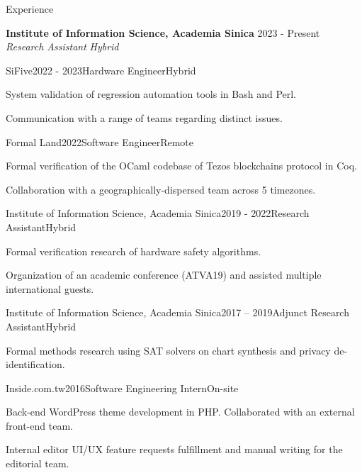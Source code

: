 \documentclass{resume} %
\begin{document}
\begin{rSection}{Experience}

{\bf Institute of Information Science, Academia Sinica} \hfill {2023 - Present} \\
{\em Research Assistant} \hfill {\em Hybrid}
\smallskip

\begin{rSubsection}{SiFive}{2022 - 2023}{Hardware Engineer}{Hybrid}
\item System validation of regression automation tools in Bash and Perl.
\item Communication with a range of teams regarding distinct issues.
\end{rSubsection}

\begin{rSubsection}{Formal Land}{2022}{Software Engineer}{Remote}
\item Formal verification of the OCaml codebase of Tezos blockchains protocol in Coq.
\item Collaboration with a geographically-dispersed team across 5 timezones.
\end{rSubsection}

\begin{rSubsection}{Institute of Information Science, Academia Sinica}{2019 - 2022}{Research Assistant}{Hybrid}
\item Formal verification research of hardware safety algorithms.
\item Organization of an academic conference (ATVA19) and assisted multiple international guests.
\end{rSubsection}


\begin{rSubsection}{Institute of Information Science, Academia Sinica}{2017 – 2019}{Adjunct Research Assistant}{Hybrid}
\item Formal methods research using SAT solvers on chart synthesis and privacy de-identification.
\end{rSubsection}


\begin{rSubsection}{Inside.com.tw}{2016}{Software Engineering Intern}{On-site}
\item Back-end WordPress theme development in PHP. Collaborated with an external front-end team.
\item Internal editor UI/UX feature requests fulfillment and manual writing for the editorial team.
\end{rSubsection}


\end{rSection}
\end{document}
